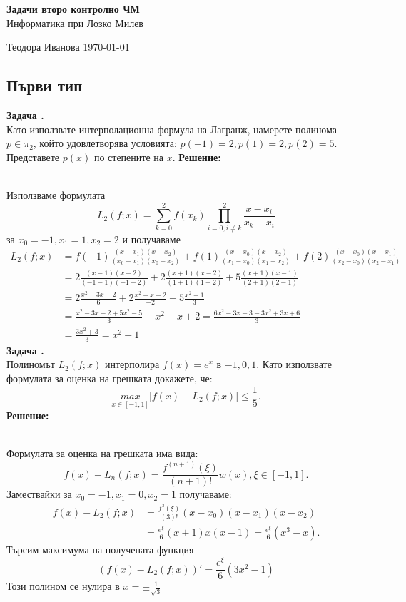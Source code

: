 \documentclass[12pt]{article}
\newcounter{problem}
\newcounter{solution}
\newcommand\problem{%
  \stepcounter{problem}%
  \textbf{Задача \theproblem.}~%
  \\
}
\newcommand\solution{%
  \textbf{Решение:}\\~%
}
\begin{document}
\begin{titlepage}
\begin{center}
    \vspace{5em}
    \textbf{\Huge{Задачи второ контролно ЧМ}}\\
    \vspace{2em}
    \LARGE{Информатика при Лозко Милев}
\end{center}
\vfill

Теодора Иванова \hfill \today
\end{titlepage}
\begin{center}{\section*{Първи тип}}\end{center}
\problem
Като използвате интерполационна формула на Лагранж, намерете полинома $p\in\pi_2$, който удовлетворява условията: $p(-1) = 2, p(1)  = 2, p(2) = 5$. Представете $p(x)$ по степените на $x$.
\solution
Използваме формулата
\begin{equation*}
L_2(f;x) = \sum_{k=0}^{2}f(x_k)\prod_{i=0,i\neq k}^{2}\frac{x-x_i}{x_k-x_i}
\end{equation*}
за $x_0=-1, x_1 = 1, x_2 = 2$
и получаваме
\begin{align*}
L_2(f;x) &= f(-1)\frac{(x-x_1)(x-x_2)}{(x_0-x_1)(x_0-x_2)}+f(1)\frac{(x-x_0)(x-x_2)}{(x_1-x_0)(x_1-x_2)}+f(2)\frac{(x-x_0)(x-x_1)}{(x_2-x_0)(x_2-x_1)}\\
&=2\frac{(x-1)(x-2)}{(-1-1)(-1-2)}+2\frac{(x+1)(x-2)}{(1+1)(1-2)}+5\frac{(x+1)(x-1)}{(2+1)(2-1)}\\
&=2\frac{x^2-3x+2}{6}+2\frac{x^2-x-2}{-2}+5\frac{x^2-1}{3}\\
&=\frac{x^2-3x+2+5x^2-5}{3} - x^2+x+2 = \frac{6x^2-3x-3-3x^2+3x+6}{3}\\
&=\frac{3x^2+3}{3} = \boxed{x^2+1}
\end{align*}
\problem
Полиномът $L_2(f;x)$ интерполира $f(x)= e^x$ в $-1, 0, 1$. Като използвате формулата за оценка на грешката докажете, че:
\begin{equation*}
\underset{x\in[-1,1]}{max}|f(x)-L_2(f;x)|\leq \frac{1}{5}.
\end{equation*}
\solution
Формулата за оценка на грешката има вида:
\begin{equation*}
f(x)-L_n(f;x) = \frac{f^{(n+1)}(\xi)}{(n+1)!}w(x), \xi\in[-1,1].
\end{equation*}
Замествайки за $x_0=-1, x_1 = 0, x_2 = 1$ получаваме:
\begin{align*}
f(x)-L_2(f;x) &= \frac{f^{3}(\xi)}{(3)!}(x-x_0)(x-x_1)(x-x_2) \\
&=\frac{e^\xi}{6}(x+1)x(x-1) = \boxed{\frac{e^\xi}{6}(x^3-x).}
\end{align*}
Търсим максимума на получената функция
\begin{equation*}
(f(x)-L_2(f;x))'=\frac{e^\xi}{6}(3x^2-1)
\end{equation*}
Този полином се нулира в $x=\pm\frac{1}{\sqrt{3}}$
\end{document}
